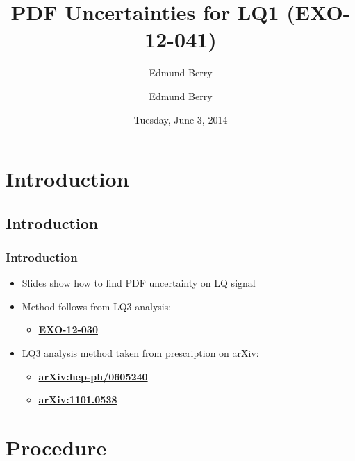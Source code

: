 \documentclass[bigger]{beamer}
\title{PDF Uncertainties for LQ1 (EXO-12-041)}
\author{Edmund Berry}
\date{Tuesday, June 3, 2014}
\author[Edmund Berry]{\alert{Edmund Berry}}
\providecommand{\alert}[1]{\textbf{#1}}
\begin{document}
\maketitle


\section{Introduction}
\label{sec-1}
\subsection{Introduction}
\label{sec-1-1}
\begin{frame}
\frametitle{Introduction}
\label{sec-1-1-1}
\begin{itemize}

\item Slides show how to find PDF uncertainty on LQ signal
\label{sec-1-1-1-1}%

\item Method follows from LQ3 analysis:
\label{sec-1-1-1-2}%
\begin{itemize}

\item \href{http://cms.cern.ch/iCMS/jsp/analysis/admin/analysismanagement.jsp?ancode=EXO-12-030}{\alert{EXO-12-030}}
\label{sec-1-1-1-2-1}%
\end{itemize} %

\item LQ3 analysis method taken from prescription on arXiv:
\label{sec-1-1-1-3}%
\begin{itemize}

\item \href{http://arxiv.org/abs/hep-ph/0605240}{\alert{arXiv:hep-ph/0605240}}
\label{sec-1-1-1-3-1}%

\item \href{http://arxiv.org/abs/1101.0538}{\alert{arXiv:1101.0538}}
\label{sec-1-1-1-3-2}%
\end{itemize} %
\end{itemize} %
\end{frame}
\section{Procedure}
\label{sec-2}
\end{document}
